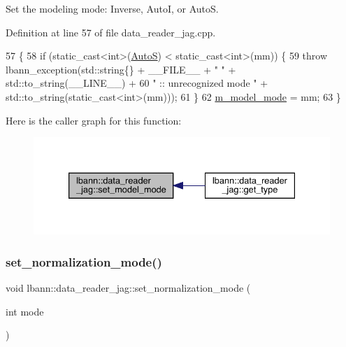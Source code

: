 Set the modeling mode\+: Inverse, AutoI, or AutoS. 



Definition at line 57 of file data\+\_\+reader\+\_\+jag.\+cpp.


\begin{DoxyCode}
57                                                           \{
58   \textcolor{keywordflow}{if} (static\_cast<int>(\hyperlink{classlbann_1_1data__reader__jag_a114c369c8604df385cf7a3ec20c9739baab2b8e8bef02dfc8ffaae80bdd0a7fd4}{AutoS}) < static\_cast<int>(mm)) \{
59     \textcolor{keywordflow}{throw} lbann\_exception(std::string\{\} + \_\_FILE\_\_ + \textcolor{stringliteral}{" "} + std::to\_string(\_\_LINE\_\_) +
60       \textcolor{stringliteral}{" :: unrecognized mode "} + std::to\_string(static\_cast<int>(mm)));
61   \}
62   \hyperlink{classlbann_1_1data__reader__jag_a877eb1f0eb2afccd73cd7d69407ff6e2}{m\_model\_mode} = mm;
63 \}
\end{DoxyCode}
Here is the caller graph for this function\+:\nopagebreak
\begin{figure}[H]
\begin{center}
\leavevmode
\includegraphics[width=333pt]{classlbann_1_1data__reader__jag_a143e41b76858ffb6606bafb376c09418_icgraph}
\end{center}
\end{figure}
\mbox{\label{classlbann_1_1data__reader__jag_a260e95eafd4e4b334cffe189db344d05}} 
\subsubsection{\texorpdfstring{set\+\_\+normalization\+\_\+mode()}{set\_normalization\_mode()}}
{\footnotesize\ttfamily void lbann\+::data\+\_\+reader\+\_\+jag\+::set\+\_\+normalization\+\_\+mode (\begin{DoxyParamCaption}\item[{int}]{mode }\end{DoxyParamCaption})}



